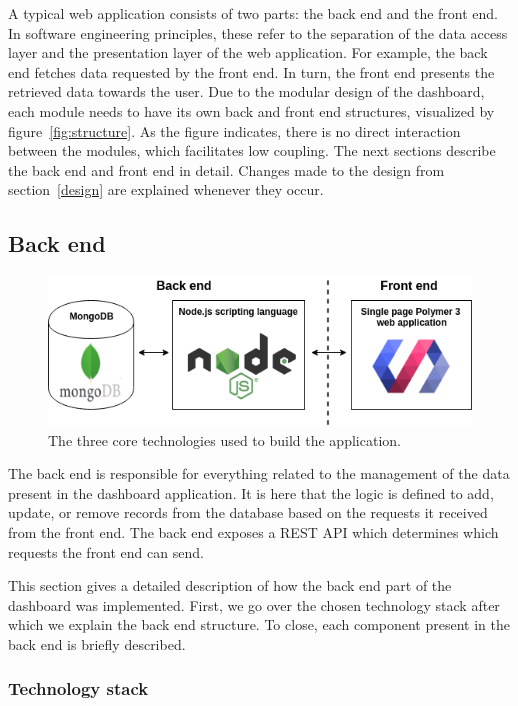     A typical web application consists of two parts: the back end and the front end. In software engineering principles, these refer to the separation of the data access layer and the presentation layer of the web application. For example, the back end fetches data requested by the front end. In turn, the front end presents the retrieved data towards the user. Due to the modular design of the dashboard, each module needs to have its own back and front end structures, visualized by figure~\ref{fig:structure}. As the figure indicates, there is no direct interaction between the modules, which facilitates low coupling. The next sections describe the back end and front end in detail. Changes made to the design from section~\ref{design} are explained whenever they occur.

    \subsection{Back end}

    \begin{figure}[!t]
        \centering
        \includegraphics[width=1\textwidth]{chapters/4_implementation/tech}
        \caption{The three core technologies used to build the application.}\label{fig:tech}
    \end{figure}

    The back end is responsible for everything related to the management of the data present in the dashboard application. It is here that the logic is defined to add, update, or remove records from the database based on the requests it received from the front end. The back end exposes a REST API which determines which requests the front end can send.

    This section gives a detailed description of how the back end part of the dashboard was implemented. First, we go over the chosen technology stack after which we explain the back end structure. To close, each component present in the back end is briefly described.

        \subsubsection{Technology stack}

